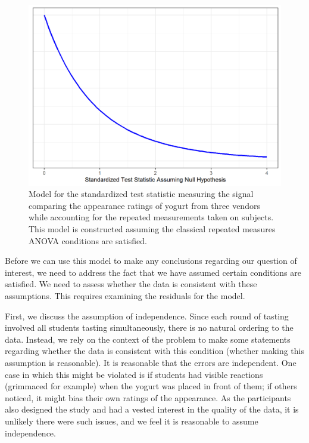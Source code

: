 \documentclass[
]{book}
\theoremstyle{plain}
\theoremstyle{mydefn}
\theoremstyle{myexmpl}
\theoremstyle{remark}
\begin{document}
\begin{figure}

{\centering \includegraphics[width=0.8\linewidth]{./Images/blockrecap-classical-null-model-1} 

}

\caption{Model for the standardized test statistic measuring the signal comparing the appearance ratings of yogurt from three vendors while accounting for the repeated measurements taken on subjects.  This model is constructed assuming the classical repeated measures ANOVA conditions are satisfied.}\label{fig:blockrecap-classical-null-model}
\end{figure}

Before we can use this model to make any conclusions regarding our question of interest, we need to address the fact that we have assumed certain conditions are satisfied. We need to assess whether the data is consistent with these assumptions. This requires examining the residuals for the model.

First, we discuss the assumption of independence. Since each round of tasting involved all students tasting simultaneously, there is no natural ordering to the data. Instead, we rely on the context of the problem to make some statements regarding whether the data is consistent with this condition (whether making this assumption is reasonable). It is reasonable that the errors are independent. One case in which this might be violated is if students had visible reactions (grimmaced for example) when the yogurt was placed in front of them; if others noticed, it might bias their own ratings of the appearance. As the participants also designed the study and had a vested interest in the quality of the data, it is unlikely there were such issues, and we feel it is reasonable to assume independence.
\end{document}
